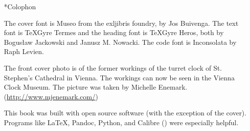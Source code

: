 \begin{chapter}*{Colophon}

\noindent The cover font is Museo from the exljibris foundry, by Jos 
Buivenga.  The text font is \TeX Gyre Termes and the heading font is \TeX Gyre
Heros, both by Bogus\l{}aw Jackowski and Janusz M. Nowacki.  The code font is
Inconsolata by Raph Levien.

The front cover photo is of the former workings of the turret clock of 
St. Stephen's Cathedral in Vienna. The workings can now be seen in the Vienna
Clock Museum. The picture was taken by Michelle Enemark. (\url{http://www.mjenemark.com/})

This book was built with open source
software (with the exception of the cover).  Programs like \LaTeX, Pandoc, Python, and Calibre
() were especially helpful.

\end{chapter}

\pagebreak
\thispagestyle{empty}
\mbox{}

